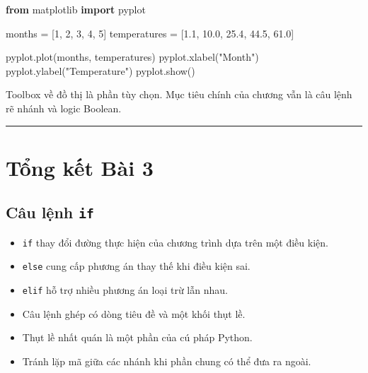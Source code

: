 \documentclass[
  11pt,
  a4paper,
]{article}
\newenvironment{Shaded}{}{}
\newcommand{\DecValTok}[1]{\textcolor[rgb]{0.25,0.63,0.44}{#1}}
\newcommand{\FloatTok}[1]{\textcolor[rgb]{0.25,0.63,0.44}{#1}}
\newcommand{\ImportTok}[1]{\textcolor[rgb]{0.00,0.50,0.00}{\textbf{#1}}}
\newcommand{\NormalTok}[1]{#1}
\newcommand{\OperatorTok}[1]{\textcolor[rgb]{0.40,0.40,0.40}{#1}}
\newcommand{\StringTok}[1]{\textcolor[rgb]{0.25,0.44,0.63}{#1}}
\providecommand{\tightlist}{%
  \setlength{\itemsep}{0pt}\setlength{\parskip}{0pt}}
\begin{document}
\begin{Shaded}
\begin{Highlighting}[]
\ImportTok{from}\NormalTok{ matplotlib }\ImportTok{import}\NormalTok{ pyplot}

\NormalTok{months }\OperatorTok{=}\NormalTok{ [}\DecValTok{1}\NormalTok{, }\DecValTok{2}\NormalTok{, }\DecValTok{3}\NormalTok{, }\DecValTok{4}\NormalTok{, }\DecValTok{5}\NormalTok{]}
\NormalTok{temperatures }\OperatorTok{=}\NormalTok{ [}\FloatTok{1.1}\NormalTok{, }\FloatTok{10.0}\NormalTok{, }\FloatTok{25.4}\NormalTok{, }\FloatTok{44.5}\NormalTok{, }\FloatTok{61.0}\NormalTok{]}

\NormalTok{pyplot.plot(months, temperatures)}
\NormalTok{pyplot.xlabel(}\StringTok{"Month"}\NormalTok{)}
\NormalTok{pyplot.ylabel(}\StringTok{"Temperature"}\NormalTok{)}
\NormalTok{pyplot.show()}
\end{Highlighting}
\end{Shaded}

Toolbox về đồ thị là phần tùy chọn. Mục tiêu chính của chương vẫn là câu
lệnh rẽ nhánh và logic Boolean.

\begin{center}\rule{0.5\linewidth}{0.5pt}\end{center}

\section{Tổng kết Bài 3}\label{tux1ed5ng-kux1ebft-buxe0i-3}

\subsection{\texorpdfstring{Câu lệnh
\texttt{if}}{Câu lệnh if}}\label{cuxe2u-lux1ec7nh-if-1}

\begin{itemize}
\tightlist
\item
  \texttt{if} thay đổi đường thực hiện của chương trình dựa trên một
  điều kiện.
\item
  \texttt{else} cung cấp phương án thay thế khi điều kiện sai.
\item
  \texttt{elif} hỗ trợ nhiều phương án loại trừ lẫn nhau.
\item
  Câu lệnh ghép có dòng tiêu đề và một khối thụt lề.
\item
  Thụt lề nhất quán là một phần của cú pháp Python.
\item
  Tránh lặp mã giữa các nhánh khi phần chung có thể đưa ra ngoài.
\end{itemize}
\end{document}
